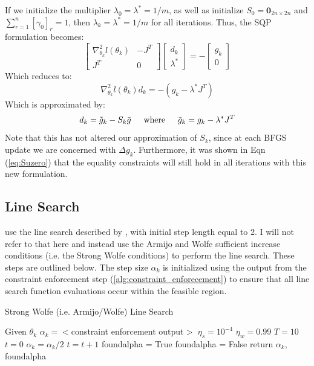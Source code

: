 \documentclass[letter,12pt]{article}
\begin{document}
If we initialize the multiplier $\lambda_0=\lambda^*=1/m$, as well as initialize $S_0 = \boldsymbol{0}_{2n \times 2n}$ and $\sum_{r=1}^{n}[\gamma_0]_r=1$, then $\lambda_k=\lambda^*=1/m$  for all iterations.  Thus, the SQP formulation becomes:  
\[
\left[
\begin{array}{cc}
\nabla^2_{\theta_k}l(\theta_k) & -J^T
\\
J^T & 0
\end{array}
\right]
\left[
\begin{array}{cc}
d_k
\\
\lambda^*
\end{array}
\right]
=
-
\left[
\begin{array}{c}
g_k
\\
0
\end{array}
\right]
\]
Which reduces to:
\[
\nabla^2_{\theta_k}l(\theta_k)d_k
=
-(g_k - \lambda^*J^T)
\]
Which is approximated by:
\[
d_k = \tilde{g}_k-S_k\bar{g}
\indent
\text{where}
\indent
\bar{g}_k = g_k-\lambda^*J^T
\]
Note that this has not altered our approximation of $S_k$, since at each BFGS update we are concerned with $\Delta g_k$.  Furthermore, it was shown in Eqn (\ref{eq:Suzero}) that the equality constraints will still hold in all iterations with this new formulation.

\subsection{Line Search}

\cite{jamshidianj97} use the line search described by \cite{jamshidianj93}, with initial step length equal to 2.  I will not refer to that here and instead use the Armijo and Wolfe sufficient increase conditions (i.e. the Strong Wolfe conditions) to perform the line search.  These steps are outlined below.  The step size $\alpha_k$ is initialized using the output from the constraint enforcement step (\ref{alg:constraint_enforecement}) to ensure that all line search function evaluations occur within the feasible region.


\begin{algorithm} 
\caption{Strong Wolfe (i.e. Armijo/Wolfe) Line Search}
\label{alg:armijo_wolfe}
\begin{algorithmic}[1]
\State Given $\theta_k$
\State $\alpha_k = <$constraint enforcement output$>$
\State $\eta_s = 10^{-4}$
\State $\eta_w = 0.99$
\State $T = 10$
\State $t = 0$
\State $\alpha_k = \alpha_k / 2$
\State $t = t + 1$
\EndWhile
{}
\State	foundalpha = True
\Else
\State  foundalpha = False
\EndIf
\State return $\alpha_k$, foundalpha
\end{algorithmic}
\end{algorithm}
\end{document}
